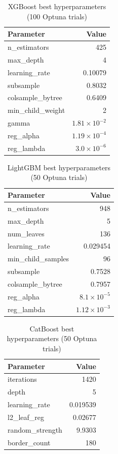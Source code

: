 \documentclass[10pt,a4paper,twocolumn]{article}
\begin{document}
\begin{table}[htbp]
\centering
\caption{XGBoost best hyperparameters (100 Optuna trials)}
\label{tab:xgb_params}
\small
\begin{tabular}{lr}
\toprule
\textbf{Parameter} & \textbf{Value} \\
\midrule
n\_estimators      & 425 \\
max\_depth         & 4 \\
learning\_rate     & 0.10079 \\
subsample          & 0.8032 \\
colsample\_bytree  & 0.6409 \\
min\_child\_weight & 2 \\
gamma              & $1.81\times10^{-2}$ \\
reg\_alpha         & $1.19\times10^{-4}$ \\
reg\_lambda        & $3.0\times10^{-6}$ \\
\bottomrule
\end{tabular}
\end{table}

\begin{table}[htbp]
\centering
\caption{LightGBM best hyperparameters (50 Optuna trials)}
\label{tab:lgb_params}
\small
\begin{tabular}{lr}
\toprule
\textbf{Parameter} & \textbf{Value} \\
\midrule
n\_estimators      & 948 \\
max\_depth         & 5 \\
num\_leaves        & 136 \\
learning\_rate     & 0.029454 \\
min\_child\_samples& 96 \\
subsample          & 0.7528 \\
colsample\_bytree  & 0.7957 \\
reg\_alpha         & $8.1\times10^{-5}$ \\
reg\_lambda        & $1.12\times10^{-3}$ \\
\bottomrule
\end{tabular}
\end{table}

\begin{table}[htbp]
\centering
\caption{CatBoost best hyperparameters (50 Optuna trials)}
\label{tab:cat_params}
\small
\begin{tabular}{lr}
\toprule
\textbf{Parameter} & \textbf{Value} \\
\midrule
iterations         & 1420 \\
depth              & 5 \\
learning\_rate     & 0.019539 \\
l2\_leaf\_reg      & 0.02677 \\
random\_strength   & 9.9303 \\
border\_count      & 180 \\
\bottomrule
\end{tabular}
\end{table}
\end{document}
